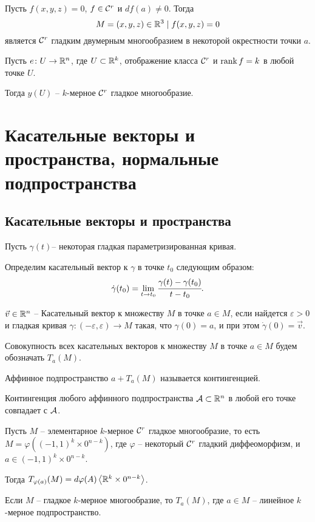 	\begin{corollary}
		Пусть $f(x,y,z)=0$, $f \in \mathcal{C}^r$ и $df(a) \not= 0$. Тогда $$M = {(x,y,z)\in \mathbb{R}^3 \mid f(x,y,z) = 0}$$ является $\mathcal{C}^r$ гладким двумерным многообразием в некоторой окрестности точки $a$.
	\end{corollary}

	\begin{theorem}
		Пусть $e\colon U \to \mathbb{R}^n$, где $U \subset \mathbb{R}^k$, отображение класса $\mathcal{C}^r$ и $\text{rank\,}f = k$ в любой точке $U$.
		
		Тогда $y(U)$ -- $k$-мерное $\mathcal{C}^r$ гладкое многообразие. 
	\end{theorem}

	\section{Касательные векторы и пространства, нормальные подпространства}
	\subsection{Касательные векторы и пространства}
	\begin{mdef}
		Пусть $\gamma(t)$-- некоторая гладкая параметризированная кривая.
		
		Определим касательный вектор к $\gamma$ в точке $t_0$ следующим образом:
		$$
			\dot \gamma (t_0) = \lim \limits_{t\to t_0} \cfrac {\gamma(t) - \gamma(t_0)} {t - t_0}.
		$$
	\end{mdef}
	\begin{mdef}
		$\vec v \in \mathbb{R}^n$ -- Касательный вектор к множеству $M$ в точке $a\in M$, если найдется $\varepsilon >0$ и гладкая кривая $\gamma\colon (-\varepsilon, \varepsilon) \to M$ такая, что $\gamma(0) = a$, и при этом $\dot \gamma(0) = \vec v$. 
		
		Совокупность всех касательных векторов к множеству $M$ в точке $a\in M$ будем обозначать $T_a(M)$.
	\end{mdef}
	\begin{remark}
		Аффинное подпространство $a+T_a(M)$ называется контингенцией.
	\end{remark}
	\begin{statement}
		Контингенция любого аффинного подпространства $\mathcal{A} \subset \mathbb{R}^n$ в любой его точке совпадает с $\mathcal{A}$.
	\end{statement}	
	\begin{statement}
		Пусть $M$ -- элементарное $k$-мерное $\mathcal{C}^r$ гладкое многообразие, то есть $M = \varphi((-1, 1)^k \times 0^{n-k})$, где $\varphi$ -- некоторый $\mathcal{C}^r$ гладкий диффеоморфизм, и $a \in (-1, 1)^k \times 0^{n-k}$.
		
		Тогда $T_{\varphi(a)}(M) = d\varphi(A)\left< \mathbb{R}^k \times 0^{n-k}\right>$.
	\end{statement}	
	\begin{corollary}
		Если $M$ -- гладкое $k$-мерное многообразие, то $T_a(M)$, где $a \in M$ -- линейное $k$-мерное подпространство.
	\end{corollary}
